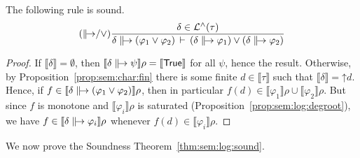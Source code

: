 \documentclass[%
  a4paper,
  UKenglish,
  cleveref,
  autoref,
  thm-restate,
  numberwithinsect,
]{lipics-v2021}
\newcommand\thesis{\vdash}
\newcommand\up{\mathord{\uparrow}}
\newcommand\I[1]{\llbracket #1 \rrbracket} %
\newcommand\ax[1]{(\mathsf{#1})}
\newcommand\temp[1]{\mathsf{#1}}
\newcommand\True{\temp{True}}
\newcommand\val{\rho}	%
\newcommand\defrealto{\mathrel\parallel\joinrel\to}
\newcommand\realto{\mathrel{\defrealto}}
\newcommand\PT{\tau}		%
\newcommand\Lang{\mathcal{L}}
\begin{document}
\begin{lemma}
\label{lem:proof:sem:log:sound:realtolor}
The following rule is sound.
\[
\ax{{\realto}/\lor}
\dfrac{\delta \in \Lang^\land(\PT)}
  {\delta \realto (\varphi_1 \lor \varphi_2)
  \,\thesis\,
  (\delta \realto \varphi_1) \lor (\delta \realto \varphi_2)}
\]
\end{lemma}

\begin{proof}
If $\I\delta = \emptyset$,
then $\I{\delta \realto \psi}\val = \I{\True}$ for all $\psi$,
hence the result.
Otherwise,
by Proposition~\ref{prop:sem:char:fin}
there is some finite $d \in \I\PT$ such that $\I\delta = \up d$.
Hence, 
if $f \in \I{\delta \realto (\varphi_1 \lor \varphi_2)}\val$,
then in particular $f(d) \in \I{\varphi_1}\val \cup \I{\varphi_2}\val$.
But since $f$ is monotone and
$\I{\varphi_i}\val$ is saturated (Proposition~\ref{prop:sem:log:degroot}),
we have
$f \in \I{\delta \realto \varphi_i}\val$
whenever $f(d) \in \I{\varphi_i}\val$.
\end{proof}


We now prove the Soundness Theorem~\ref{thm:sem:log:sound}.

\ThmLogSound*
\end{document}
